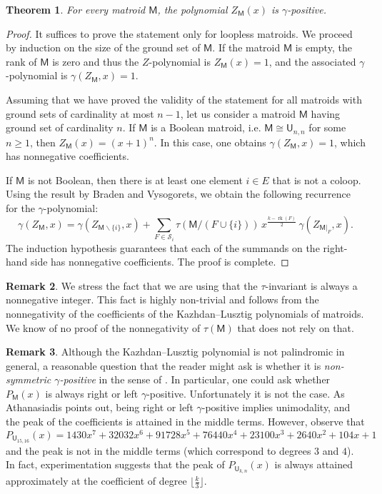 \documentclass[11pt, a4paper, english]{amsart}
\theoremstyle{teoremas}
\newtheorem{theorem}{Theorem}[section]
\theoremstyle{definition}
\newtheorem{remark}[theorem]{Remark}
\DeclareMathOperator{\rk}{rk}
\newcommand{\M}{\mathsf{M}}
\newcommand{\U}{\mathsf{U}}
\begin{document}
\begin{theorem}\label{thm:z-is-gamma-positive}
    For every matroid $\M$, the polynomial $Z_{\M}(x)$ is $\gamma$-positive.
\end{theorem}

\begin{proof}
    It suffices to prove the statement only for loopless matroids. We proceed by induction on the size of the ground set of $\M$. If the matroid $\M$ is empty, the rank of $\M$ is zero and thus the $Z$-polynomial is $Z_{\M}(x) = 1$, and the associated $\gamma$-polynomial is $\gamma(Z_{\M},x) = 1$.
    
    Assuming that we have proved the validity of the statement for all matroids with ground sets of cardinality at most $n-1$, let us consider a matroid $\M$ having ground set of cardinality $n$. If $\M$ is a Boolean matroid, i.e. $\M \cong \U_{n,n}$ for some $n\geq 1$, then $Z_{\M}(x) = (x+1)^n$. In this case, one obtains $\gamma(Z_{\M}, x) = 1$, which has nonnegative coefficients.
    
    If $\M$ is not Boolean, then there is at least one element $i\in E$ that is not a coloop. Using the result by Braden and Vysogorets, we obtain the following recurrence for the $\gamma$-polynomial:
    \[ \gamma(Z_{\M},x) = \gamma(Z_{\M\smallsetminus\{i\}},x) + \sum_{F\in\mathscr{S}_i} \tau\left(\M/{(F\cup\{i\})}\right)\, x^{\frac{k - \rk(F)}{2}}\, \gamma(Z_{\M|_F},x).\]
    The induction hypothesis guarantees that each of the summands on the right-hand side has nonnegative coefficients. The proof is complete.
\end{proof}

\begin{remark}
    We stress the fact that we are using that the $\tau$-invariant is always a nonnegative integer. This fact is highly non-trivial and follows from the nonnegativity of the coefficients of the Kazhdan--Lusztig polynomials of matroids. We know of no proof of the nonnegativity of $\tau(\M)$ that does not rely on that.
\end{remark}


\begin{remark}
    Although the Kazhdan--Lusztig polynomial is not palindromic in general, a reasonable question that the reader might ask is whether it is \emph{non-symmetric $\gamma$-positive} in the sense of \cite[Section 5.1]{athanasiadis-gamma-positivity}. In particular, one could ask whether $P_{\M}(x)$ is always right or left $\gamma$-positive. Unfortunately it is not the case. As Athanasiadis points out, being right or left $\gamma$-positive implies unimodality, and the peak of the coefficients is attained in the middle terms. However, observe that
    \[ P_{\U_{15,16}}(x) = 1430x^7 + 32032x^6 + \boxed{91728}x^5 + 76440x^4 + 23100x^3 + 2640x^2 + 104x + 1\]
    and the peak is not in the middle terms (which correspond to degrees $3$ and $4$). In fact, experimentation suggests that the peak of $P_{\U_{k,n}}(x)$ is always attained approximately at the coefficient of degree $\lfloor\frac{k}{3}\rfloor$.
\end{remark}
\end{document}
